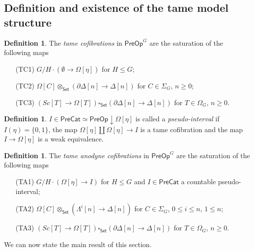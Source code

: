 \documentclass[a4paper,10pt
,draft
]{article}%
\numberwithin{equation}{section}
\numberwithin{figure}{section}
\theoremstyle{definition} %
\newtheorem{definition}[equation]{Definition}%
\newcommand{\1}{\ensuremath{\mathbbm 1}}%
\begin{document}
\subsection{Definition and existence of the tame model structure}
\label{TAMEDEFEX SEC}

\begin{definition}\label{TAMEGENCOF DEF}
	The \emph{tame cofibrations} in $\mathsf{PreOp}^G$
	are the saturation of the following maps
	\begin{itemize}
		\item[(TC1)] $G/H \cdot \left(\emptyset \to\Omega[\eta]\right)$ for $H\leq G$;
		\item[(TC2)] $\Omega[C] \otimes_{\mathsf{Set}} \left(\partial \Delta[n] \to \Delta[n]\right)$ for $C \in \Sigma_G$, $n \geq 0$;
		\item[(TC3)] 
		$\left( Sc[T] \to \Omega[T] \right) 
		\square_{\mathsf{Set}} 
		\left(\partial \Delta[n] \to \Delta[n]\right)$ for $T \in \Omega_G$, $n \geq 0$.
	\end{itemize}
\end{definition}


\begin{definition}\label{PSEUINT DEF}
	$I \in \mathsf{PreCat}\simeq \mathsf{PreOp} \downarrow \Omega[\eta]$ 
	is called a \emph{pseudo-interval}
	if $I(\eta) = \{0,1\}$,
	the map 
	$\Omega[\eta] \amalg \Omega[\eta] \to I$
	is a tame cofibration and the map
	$I \to \Omega[\eta]$
	is a weak equivalence.
\end{definition}


\begin{definition}\label{TAMEGENANO DEF}
	The \emph{tame anodyne cofibrations} in $\mathsf{PreOp}^G$ 
	are the saturation of the following maps
	\begin{itemize}
		\item[(TA1)] $G/H \cdot 
		\left(\Omega[\eta] \to I \right)$ for $H \leq G$
		and $I \in \mathsf{PreCat}$
		a countable pseudo-interval;
		\item[(TA2)] $\Omega[C] \otimes_{\mathsf{Set}}\left(\Lambda^i[n] \to \Delta[n]\right)$ for $C \in \Sigma_G$, $0 \leq i \leq n$, $1 \leq n$;
		\item[(TA3)] 
		$\left( Sc[T] \to \Omega[T] \right) 
		\square_{\mathsf{Set}} 
		\left(\partial \Delta[n] \to \Delta[n]\right)$ for $T \in \Omega_G$, $n \geq 0$.
	\end{itemize}
\end{definition}


We can now state the main result of this section.
\end{document}
